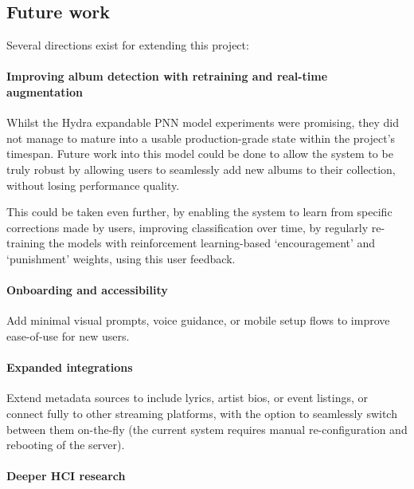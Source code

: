         
        \subsection{Future work}
          Several directions exist for extending this project:
    
          \paragraph{Improving album detection with retraining and real-time augmentation}
    
          Whilst the Hydra expandable PNN model experiments were promising, they did not manage to mature into a usable production-grade state within the project's timespan. Future work into this model could be done to allow the system to be truly robust by allowing users to seamlessly add new albums to their collection, without losing performance quality.
    
          This could be taken even further, by enabling the system to learn from specific corrections made by users, improving classification over time, by regularly re-training the models with reinforcement learning-based `encouragement' and `punishment' weights, using this user feedback.
    
          \paragraph{Onboarding and accessibility}
    
          Add minimal visual prompts, voice guidance, or mobile setup flows to improve ease-of-use for new users.
    
          \paragraph{Expanded integrations}
    
          Extend metadata sources to include lyrics, artist bios, or event listings, or connect fully to other streaming platforms, with the option to seamlessly switch between them on-the-fly (the current system requires manual re-configuration and rebooting of the server).
    
          \paragraph{Deeper HCI research}
    
